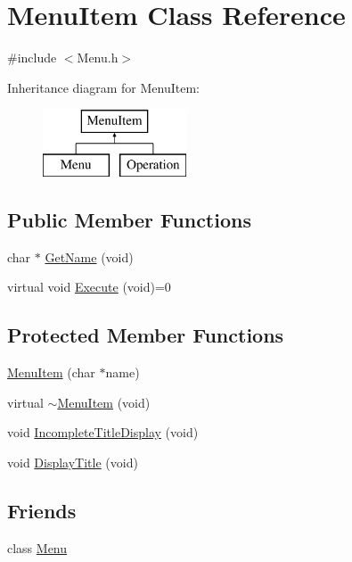 \hypertarget{class_menu_item}{}\section{Menu\+Item Class Reference}
\label{class_menu_item}


{\ttfamily \#include $<$Menu.\+h$>$}

Inheritance diagram for Menu\+Item\+:\begin{figure}[H]
\begin{center}
\leavevmode
\includegraphics[height=2.000000cm]{class_menu_item}
\end{center}
\end{figure}
\subsection*{Public Member Functions}
\begin{DoxyCompactItemize}
\item 
char $\ast$ \hyperlink{class_menu_item_af23de886a192dede54b3254db5aa1830}{Get\+Name} (void)
\item 
virtual void \hyperlink{class_menu_item_a08f0695dbfdad36bc9aab7597df02a00}{Execute} (void)=0
\end{DoxyCompactItemize}
\subsection*{Protected Member Functions}
\begin{DoxyCompactItemize}
\item 
\hyperlink{class_menu_item_aa966696433faf0de75908d9789025f1f}{Menu\+Item} (char $\ast$name)
\item 
virtual \hyperlink{class_menu_item_a75a72b552ba092d7f0d24081648f5912}{$\sim$\+Menu\+Item} (void)
\item 
void \hyperlink{class_menu_item_aebc0f7620d970a978a24628adbfbe955}{Incomplete\+Title\+Display} (void)
\item 
void \hyperlink{class_menu_item_adbd2e567da57274ed67ed261a93fde56}{Display\+Title} (void)
\end{DoxyCompactItemize}
\subsection*{Friends}
\begin{DoxyCompactItemize}
\item 
class \hyperlink{class_menu_item_a834cec0fab7efabab3cd53540e4d466d}{Menu}
\end{DoxyCompactItemize}



